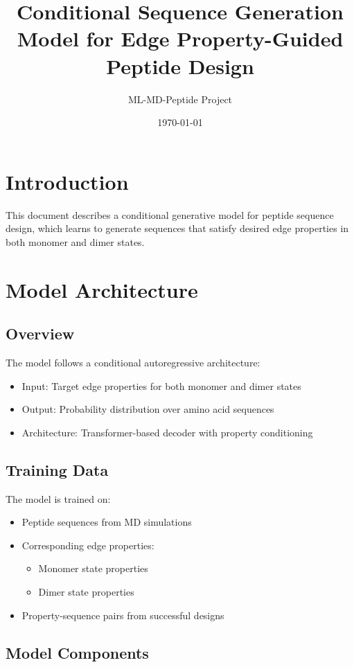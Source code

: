 \documentclass[11pt]{article}
\title{Conditional Sequence Generation Model for Edge Property-Guided Peptide Design}
\author{ML-MD-Peptide Project}
\date{\today}
\begin{document}
\maketitle

\section{Introduction}
This document describes a conditional generative model for peptide sequence design, which learns to generate sequences that satisfy desired edge properties in both monomer and dimer states.

\section{Model Architecture}

\subsection{Overview}
The model follows a conditional autoregressive architecture:
\begin{itemize}
    \item Input: Target edge properties for both monomer and dimer states
    \item Output: Probability distribution over amino acid sequences
    \item Architecture: Transformer-based decoder with property conditioning
\end{itemize}

\subsection{Training Data}
The model is trained on:
\begin{itemize}
    \item Peptide sequences from MD simulations
    \item Corresponding edge properties:
        \begin{itemize}
            \item Monomer state properties
            \item Dimer state properties
        \end{itemize}
    \item Property-sequence pairs from successful designs
\end{itemize}

\subsection{Model Components}
\end{document}

